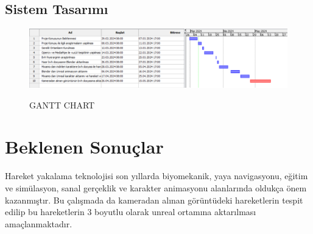 \documentclass[12pt, a4paper]{article}
\begin{document}
\newpage
\begin{landscape}
\subsection{Sistem Tasarımı}

	\begin{figure}[!htbp] %
		\caption{GANTT CHART}
		\centering
		\includegraphics[height= 5 cm]{x.png}
		\label{gantt}
	\end{figure}
\end{landscape}
\newpage
\section{Beklenen Sonuçlar}
Hareket yakalama teknolojisi son yıllarda biyomekanik, yaya
navigasyonu, eğitim ve simülasyon, sanal gerçeklik ve
karakter animasyonu alanlarında oldukça önem kazanmıştır.
Bu çalışmada da kameradan alınan görüntüdeki hareketlerin tespit edilip bu hareketlerin 3 boyutlu olarak unreal ortamına aktarılması amaçlanmaktadır.



 
\end{document}
